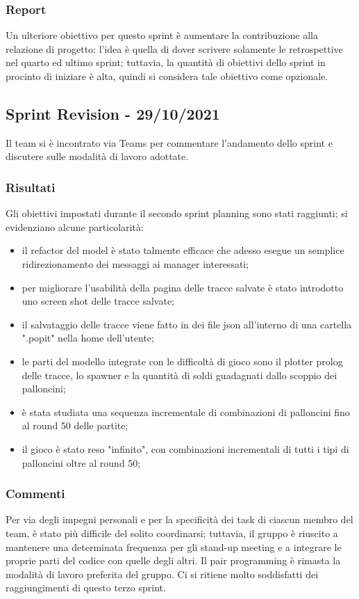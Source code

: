 \subsubsection{Report}
Un ulteriore obiettivo per questo sprint è aumentare la contribuzione alla relazione di progetto: l'idea è quella di
dover scrivere solamente le retrospettive nel quarto ed ultimo sprint; tuttavia, la quantità di obiettivi dello sprint
in procinto di iniziare è alta, quindi si considera tale obiettivo come opzionale.

\subsection{Sprint Revision - 29/10/2021}
Il team si è incontrato via Teams per commentare l'andamento dello sprint e discutere sulle modalità di lavoro adottate.

\subsubsection{Risultati}
Gli obiettivi impostati durante il secondo sprint planning sono stati raggiunti; si evidenziano alcune particolarità:
\begin{itemize}
    \item il refactor del model è stato talmente efficace che adesso esegue un semplice ridirezionamento dei messaggi ai manager interessati;
    \item per migliorare l'usabilità della pagina delle tracce salvate è stato introdotto uno screen shot delle tracce salvate;
    \item il salvataggio delle tracce viene fatto in dei file json all'interno di una cartella ".popit" nella home dell'utente;
    \item le parti del modello integrate con le difficoltà di gioco sono il plotter prolog delle tracce, lo spawner e la quantità di soldi guadagnati dallo scoppio dei palloncini;
    \item è stata studiata una sequenza incrementale di combinazioni di palloncini fino al round 50 delle partite;
    \item il gioco è stato reso "infinito", con combinazioni incrementali di tutti i tipi di palloncini oltre al round 50;
\end{itemize}

\subsubsection{Commenti}
Per via degli impegni personali e per la specificità dei task di ciascun membro del team, è stato più difficile del
solito coordinarsi; tuttavia, il gruppo è riuscito a mantenere una determinata frequenza per gli stand-up meeting e a
integrare le proprie parti del codice con quelle degli altri. Il pair programming è rimasta la modalità di lavoro
preferita del gruppo. Ci si ritiene molto soddisfatti dei raggiungimenti di questo terzo sprint.